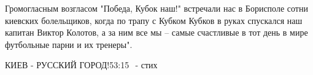 Громогласным возгласом "Победа, Кубок наш!" встречали нас в Борисполе сотни
киевских болельщиков, когда по трапу с Кубком Кубков в руках спускался наш
капитан Виктор Колотов, а за ним все мы – самые счастливые в тот день в мире
футбольные парни и их тренеры".



КИЕВ - РУССКИЙ ГОРОД!⁣⁣53:15⠀- стих












